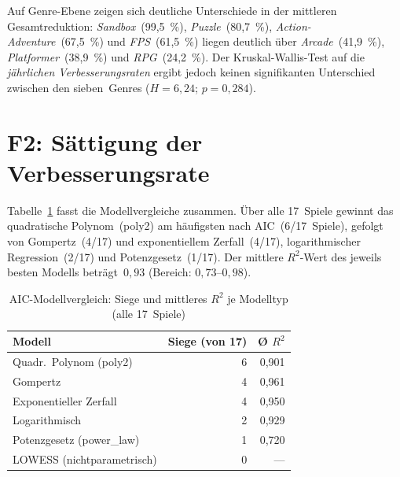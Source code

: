 Auf Genre-Ebene zeigen sich deutliche Unterschiede in der mittleren Gesamtreduktion: \textit{Sandbox}~(99,5~\%), \textit{Puzzle}~(80,7~\%), \textit{Action-Adventure}~(67,5~\%) und \textit{FPS}~(61,5~\%) liegen deutlich über \textit{Arcade}~(41,9~\%), \textit{Platformer}~(38,9~\%) und \textit{RPG}~(24,2~\%). Der Kruskal-Wallis-Test auf die \emph{jährlichen Verbesserungsraten} ergibt jedoch keinen signifikanten Unterschied zwischen den sieben~Genres ($H = 6{,}24$; $p = 0{,}284$).



\section{F2: Sättigung der Verbesserungsrate}

Tabelle~\ref{tab:q2_modelle} fasst die Modellvergleiche zusammen. Über alle 17~Spiele gewinnt das quadratische Polynom~(poly2) am häufigsten nach AIC~(6/17~Spiele), gefolgt von Gompertz~(4/17) und exponentiellem Zerfall~(4/17), logarithmischer Regression~(2/17) und Potenzgesetz~(1/17). Der mittlere $R^2$-Wert des jeweils besten Modells beträgt~$0{,}93$ (Bereich: $0{,}73$–$0{,}98$).

\begin{table}[htb]
  \centering
  \caption{AIC-Modellvergleich: Siege und mittleres $R^2$ je Modelltyp (alle 17~Spiele)}
  \label{tab:q2_modelle}
  \small
  \begin{tabular}{lrr}
    \toprule
    \textbf{Modell} & \textbf{Siege (von 17)} & \textbf{Ø $R^2$} \\
    \midrule
    Quadr.\ Polynom (poly2)  & 6 & 0,901 \\
    Gompertz                  & 4 & 0,961 \\
    Exponentieller Zerfall    & 4 & 0,950 \\
    Logarithmisch             & 2 & 0,929 \\
    Potenzgesetz (power\_law) & 1 & 0,720 \\
    LOWESS (nichtparametrisch) & 0 & --- \\
    \bottomrule
  \end{tabular}
\end{table}

